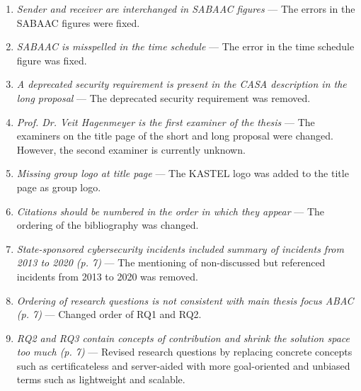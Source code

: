 \begin{enumerate}[label=R\arabic*.]
\begin{enumerate}[label=Q\arabic*.]
        \item \textit{Sender and receiver are interchanged in SABAAC figures} --- The errors in the SABAAC figures were fixed.
        \item \textit{SABAAC is misspelled in the time schedule} --- The error in the time schedule figure was fixed.
        \item \textit{A deprecated security requirement is present in the CASA description in the long proposal} --- The deprecated security requirement was removed.
        \item \textit{Prof. Dr. Veit Hagenmeyer is the first examiner of the thesis} --- The examiners on the title page of the short and long proposal were changed. However, the second examiner is currently unknown.
        \item \textit{Missing group logo at title page} --- The KASTEL logo was added to the title page as group logo.
        \item \textit{Citations should be numbered in the order in which they appear} --- The ordering of the bibliography was changed.
        \item \textit{State-sponsored cybersecurity incidents included summary of incidents from 2013 to 2020 (p. 7)} --- The mentioning of non-discussed but referenced incidents from 2013 to 2020 was removed.
        \item \textit{Ordering of research questions is not consistent with main thesis focus ABAC (p. 7)} --- Changed order of RQ1 and RQ2.
        \item \textit{RQ2 and RQ3 contain concepts of contribution and shrink the solution space too much (p. 7)} --- Revised research questions by replacing concrete concepts such as certificateless and server-aided with more goal-oriented and unbiased terms such as lightweight and scalable.
    \end{enumerate}
\end{enumerate}
